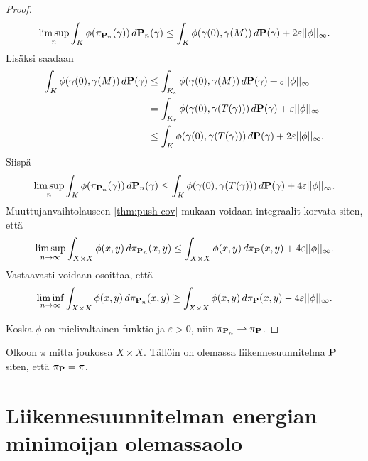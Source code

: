 \documentclass[12pt,oneside,a4paper]{amsbook} %
\begin{document}
\begin{proof}
    \begin{align*}
        \limsup_{n} \int_{K} \phi(\pi_{\P_n}(\gamma)) \, d\P_n (\gamma) \le \int_{K} \phi(\gamma(0),\gamma(M)) \, d\P (\gamma) + 2\varepsilon||\phi||_\infty.
    \end{align*}
Lisäksi saadaan
    \begin{align*}
        \int_K \phi(\gamma(0),\gamma(M)) \, d\P (\gamma) &\le \int_{K_\varepsilon} \phi(\gamma(0),\gamma(M)) \, d\P (\gamma) + \varepsilon||\phi||_\infty \\
        &=\int_{K_\varepsilon} \phi(\gamma(0),\gamma(T(\gamma))) \, d\P (\gamma) + \varepsilon||\phi||_\infty \\
        &\le \int_{K} \phi(\gamma(0),\gamma(T(\gamma))) \, d\P (\gamma) + 2\varepsilon||\phi||_\infty.
    \end{align*}
Siispä
    \begin{equation*}
        \limsup_{n} \int_{K} \phi(\pi_{\P_n}(\gamma)) \, d\P_n (\gamma) \le \int_{K} \phi(\gamma(0),\gamma(T(\gamma))) \, d\P (\gamma) + 4\varepsilon||\phi||_\infty.
    \end{equation*}
Muuttujanvaihtolauseen \ref{thm:push-cov} mukaan voidaan integraalit korvata siten, että
    \begin{equation*}
        \limsup_{n\to\infty} \int_{X \times X} \phi(x, y) \, d\pi_{\P_n} (x, y) \le \int_{X \times X} \phi(x, y) \, d\pi_{\P} (x, y) + 4\varepsilon||\phi||_\infty.
    \end{equation*}
Vastaavasti voidaan osoittaa, että 
    \begin{equation*}
        \liminf_{n\to\infty} \int_{X \times X} \phi(x, y) \, d\pi_{\P_n} (x, y) \ge \int_{X \times X} \phi(x, y) \, d\pi_{\P} (x, y) - 4\varepsilon||\phi||_\infty.
    \end{equation*}

Koska $\phi$ on mielivaltainen funktio ja $\varepsilon > 0$, niin $\pi_{\P_n} \rightharpoonup \pi_\P$.
\end{proof}

\begin{corollary}
    Olkoon $\pi$ mitta joukossa $X \times X$. Tällöin on olemassa liikennesuunnitelma $\P$ siten, että $\pi_\P = \pi$.
\end{corollary}

\chapter{Liikennesuunnitelman energian minimoijan olemassaolo}
\end{document}
